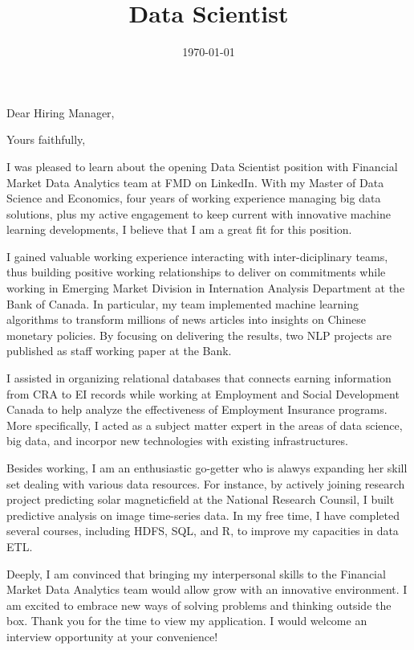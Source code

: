 \documentclass[12pt,a4paper,roman]{moderncv}        %
\title{Data Scientist\vspace*{15pt}}                               %
\begin{document}

\date{\today}
\opening{Dear Hiring Manager,}
\closing{Yours faithfully,}

\makelettertitle

I was pleased to learn about the opening Data Scientist position with Financial Market Data Analytics team at FMD on LinkedIn. With my Master of Data Science and Economics, four years of working experience managing big data solutions, plus my active engagement to keep current with innovative machine learning developments, I believe that I am a great fit for this position. 
\bigskip

I gained valuable working experience interacting with inter-diciplinary teams, thus building positive working relationships to deliver on commitments while working in Emerging Market Division in Internation Analysis Department at the Bank of Canada. In particular, my team implemented machine learning algorithms to transform millions of news articles into insights on Chinese monetary policies. By focusing on delivering the results, two NLP projects are published as staff working paper at the Bank.  
\bigskip

I assisted in organizing relational databases that connects earning information from CRA to EI records while working at Employment and Social Development Canada to help analyze the effectiveness of Employment Insurance programs. More specifically, I acted as a subject matter expert in the areas of data science, big data, and incorpor new technologies with existing infrastructures. 
\bigskip 

Besides working, I am an enthusiastic go-getter who is alawys expanding her skill set dealing with various data resources. For instance, by actively joining research project predicting solar magneticfield at the National Research Counsil, I built predictive analysis on image time-series data. In my free time, I have completed several courses, including HDFS, SQL, and R, to improve my capacities in data ETL. 
\bigskip

Deeply, I am convinced that bringing my interpersonal skills to the Financial Market Data Analytics team would allow grow with an innovative environment. I am excited to embrace new ways of solving problems and thinking outside the box. Thank you for the time to view my application. I would welcome an interview opportunity at your convenience!
\bigskip

\makeletterclosing
\end{document}
